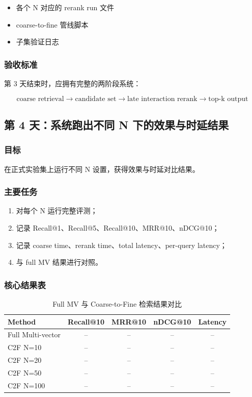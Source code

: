 \documentclass[UTF8,a4paper,12pt]{ctexart}
\begin{document}
	\begin{itemize}[leftmargin=2em]
		\item 各个 N 对应的 rerank run 文件
		\item coarse-to-fine 管线脚本
		\item 子集验证日志
	\end{itemize}
	
	\subsubsection*{验收标准}
	
	第 3 天结束时，应拥有完整的两阶段系统：
	
	$$
	\text{coarse retrieval} \rightarrow \text{candidate set} \rightarrow \text{late interaction rerank} \rightarrow \text{top-k output}
	$$
	
	\subsection{第 4 天：系统跑出不同 N 下的效果与时延结果}
	
	\subsubsection*{目标}
	
	在正式实验集上运行不同 N 设置，获得效果与时延对比结果。
	
	\subsubsection*{主要任务}
	
	\begin{enumerate}[leftmargin=2em]
		\item 对每个 N 运行完整评测；
		\item 记录 Recall@1、Recall@5、Recall@10、MRR@10、nDCG@10；
		\item 记录 coarse time、rerank time、total latency、per-query latency；
		\item 与 full MV 结果进行对照。
	\end{enumerate}
	
	\subsubsection*{核心结果表}
	
	\begin{table}[H]
		\centering
		\caption{Full MV 与 Coarse-to-Fine 检索结果对比}
		\begin{tabular}{lcccc}
			\toprule
			\textbf{Method} & \textbf{Recall@10} & \textbf{MRR@10} & \textbf{nDCG@10} & \textbf{Latency} \\
			\midrule
			Full Multi-vector & -- & -- & -- & -- \\
			C2F N=10 & -- & -- & -- & -- \\
			C2F N=20 & -- & -- & -- & -- \\
			C2F N=50 & -- & -- & -- & -- \\
			C2F N=100 & -- & -- & -- & -- \\
			\bottomrule
		\end{tabular}
	\end{table}
	
\end{document}
